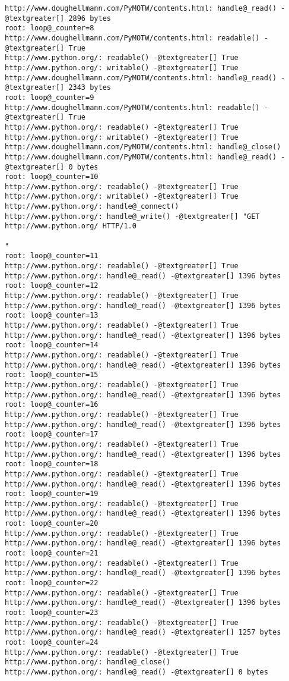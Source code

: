 \documentclass[a4paper,10pt,english]{manual}
\begin{document}
\begin{Verbatim}[commandchars=@\[\]]
http://www.doughellmann.com/PyMOTW/contents.html: handle@_read() -@textgreater[] 2896 bytes
root: loop@_counter=8
http://www.doughellmann.com/PyMOTW/contents.html: readable() -@textgreater[] True
http://www.python.org/: readable() -@textgreater[] True
http://www.python.org/: writable() -@textgreater[] True
http://www.doughellmann.com/PyMOTW/contents.html: handle@_read() -@textgreater[] 2343 bytes
root: loop@_counter=9
http://www.doughellmann.com/PyMOTW/contents.html: readable() -@textgreater[] True
http://www.python.org/: readable() -@textgreater[] True
http://www.python.org/: writable() -@textgreater[] True
http://www.doughellmann.com/PyMOTW/contents.html: handle@_close()
http://www.doughellmann.com/PyMOTW/contents.html: handle@_read() -@textgreater[] 0 bytes
root: loop@_counter=10
http://www.python.org/: readable() -@textgreater[] True
http://www.python.org/: writable() -@textgreater[] True
http://www.python.org/: handle@_connect()
http://www.python.org/: handle@_write() -@textgreater[] "GET http://www.python.org/ HTTP/1.0

"
root: loop@_counter=11
http://www.python.org/: readable() -@textgreater[] True
http://www.python.org/: handle@_read() -@textgreater[] 1396 bytes
root: loop@_counter=12
http://www.python.org/: readable() -@textgreater[] True
http://www.python.org/: handle@_read() -@textgreater[] 1396 bytes
root: loop@_counter=13
http://www.python.org/: readable() -@textgreater[] True
http://www.python.org/: handle@_read() -@textgreater[] 1396 bytes
root: loop@_counter=14
http://www.python.org/: readable() -@textgreater[] True
http://www.python.org/: handle@_read() -@textgreater[] 1396 bytes
root: loop@_counter=15
http://www.python.org/: readable() -@textgreater[] True
http://www.python.org/: handle@_read() -@textgreater[] 1396 bytes
root: loop@_counter=16
http://www.python.org/: readable() -@textgreater[] True
http://www.python.org/: handle@_read() -@textgreater[] 1396 bytes
root: loop@_counter=17
http://www.python.org/: readable() -@textgreater[] True
http://www.python.org/: handle@_read() -@textgreater[] 1396 bytes
root: loop@_counter=18
http://www.python.org/: readable() -@textgreater[] True
http://www.python.org/: handle@_read() -@textgreater[] 1396 bytes
root: loop@_counter=19
http://www.python.org/: readable() -@textgreater[] True
http://www.python.org/: handle@_read() -@textgreater[] 1396 bytes
root: loop@_counter=20
http://www.python.org/: readable() -@textgreater[] True
http://www.python.org/: handle@_read() -@textgreater[] 1396 bytes
root: loop@_counter=21
http://www.python.org/: readable() -@textgreater[] True
http://www.python.org/: handle@_read() -@textgreater[] 1396 bytes
root: loop@_counter=22
http://www.python.org/: readable() -@textgreater[] True
http://www.python.org/: handle@_read() -@textgreater[] 1396 bytes
root: loop@_counter=23
http://www.python.org/: readable() -@textgreater[] True
http://www.python.org/: handle@_read() -@textgreater[] 1257 bytes
root: loop@_counter=24
http://www.python.org/: readable() -@textgreater[] True
http://www.python.org/: handle@_close()
http://www.python.org/: handle@_read() -@textgreater[] 0 bytes
\end{Verbatim}
\end{document}
